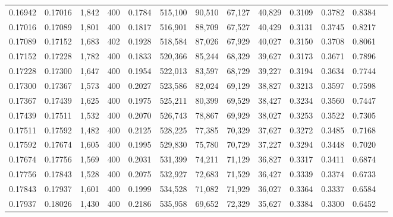 \begin{tabular}{rrrrrrrrrrrrr}
0.16942 & 0.17016 &  1,842 &   400 &                                     0.1784 & 515,100 &  90,510 &  67,127 &  40,829 & 0.3109 & 0.3782 & 0.8384 \\
0.17016 & 0.17089 &  1,801 &   400 &                                     0.1817 & 516,901 &  88,709 &  67,527 &  40,429 & 0.3131 & 0.3745 & 0.8217 \\
0.17089 & 0.17152 &  1,683 &   402 &                                     0.1928 & 518,584 &  87,026 &  67,929 &  40,027 & 0.3150 & 0.3708 & 0.8061 \\
0.17152 & 0.17228 &  1,782 &   400 &                                     0.1833 & 520,366 &  85,244 &  68,329 &  39,627 & 0.3173 & 0.3671 & 0.7896 \\
0.17228 & 0.17300 &  1,647 &   400 &                                     0.1954 & 522,013 &  83,597 &  68,729 &  39,227 & 0.3194 & 0.3634 & 0.7744 \\
0.17300 & 0.17367 &  1,573 &   400 &                                     0.2027 & 523,586 &  82,024 &  69,129 &  38,827 & 0.3213 & 0.3597 & 0.7598 \\
0.17367 & 0.17439 &  1,625 &   400 &                                     0.1975 & 525,211 &  80,399 &  69,529 &  38,427 & 0.3234 & 0.3560 & 0.7447 \\
0.17439 & 0.17511 &  1,532 &   400 &                                     0.2070 & 526,743 &  78,867 &  69,929 &  38,027 & 0.3253 & 0.3522 & 0.7305 \\
0.17511 & 0.17592 &  1,482 &   400 &                                     0.2125 & 528,225 &  77,385 &  70,329 &  37,627 & 0.3272 & 0.3485 & 0.7168 \\
0.17592 & 0.17674 &  1,605 &   400 &                                     0.1995 & 529,830 &  75,780 &  70,729 &  37,227 & 0.3294 & 0.3448 & 0.7020 \\
0.17674 & 0.17756 &  1,569 &   400 &                                     0.2031 & 531,399 &  74,211 &  71,129 &  36,827 & 0.3317 & 0.3411 & 0.6874 \\
0.17756 & 0.17843 &  1,528 &   400 &                                     0.2075 & 532,927 &  72,683 &  71,529 &  36,427 & 0.3339 & 0.3374 & 0.6733 \\
0.17843 & 0.17937 &  1,601 &   400 &                                     0.1999 & 534,528 &  71,082 &  71,929 &  36,027 & 0.3364 & 0.3337 & 0.6584 \\
0.17937 & 0.18026 &  1,430 &   400 &                                     0.2186 & 535,958 &  69,652 &  72,329 &  35,627 & 0.3384 & 0.3300 & 0.6452 \\

\end{tabular}
